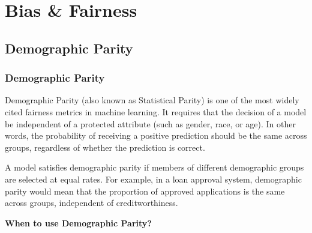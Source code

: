 \chapter{Bias \& Fairness}


\clearpage
\thispagestyle{biasfairnesstyle}
\section{Demographic Parity}
\subsection{Demographic Parity}


Demographic Parity (also known as Statistical Parity) is one of the most widely cited fairness metrics in machine learning.
It requires that the decision of a model be independent of a protected attribute (such as gender, race, or age). In other words,
the probability of receiving a positive prediction should be the same across groups, regardless of whether the prediction is correct.

\begin{center}
\end{center}

A model satisfies demographic parity if members of different demographic groups are selected at equal rates. For example, in a loan approval
system, demographic parity would mean that the proportion of approved applications is the same across groups, independent of creditworthiness.

\textbf{When to use Demographic Parity?}

